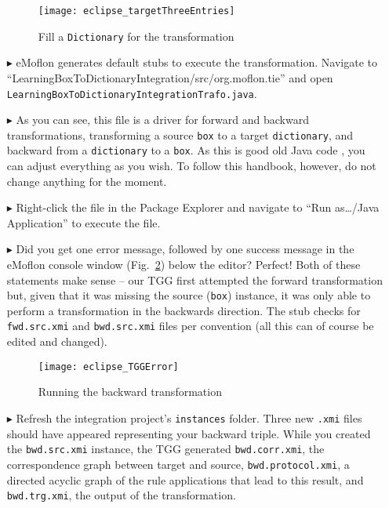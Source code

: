 \begin{itemize}
\begin{figure}[htbp]
\begin{center}
  \texttt{[image: eclipse\_targetThreeEntries]}
  \caption{Fill a \texttt{Dictionary} for the transformation}
  \label{eclipse:dictionaryxmi}
\end{center}
\end{figure}

\item[$\blacktriangleright$] eMoflon generates default stubs to execute the transformation.
Navigate to ``LearningBox\-To\-Dictionary\-In\-te\-gra\-tion\-/\-src/\-org.\-mof\-lon.\-tie'' and open \texttt{Learn\-ing\-Box\-To\-Dict\-ion\-ary\-Int\-e\-grat\-ion\-Trafo.\-java}.

\item[$\blacktriangleright$] As you can see, this file is a driver for forward and backward transformations, transforming a source \texttt{box} to a target \texttt{dictionary}, and backward from a \texttt{dictionary} to a \texttt{box}. 
As this is good old Java code , you can adjust everything as you wish.
To follow this handbook, however, do not change anything for the moment.

\item[$\blacktriangleright$] Right-click the file in the Package Explorer and navigate to ``Run as\ldots/Java Application'' to execute the file.

\item[$\blacktriangleright$] Did you get one error message, followed by one success message in the eMoflon console window (Fig.~\ref{eclipse:tggERROR}) below
the editor? Perfect! Both of these statements make sense -- our TGG first attempted the forward transformation but, given that it was missing the source
(\texttt{box}) instance, it was only able to perform a transformation in the backwards direction.
The stub checks for \texttt{fwd.src.xmi} and \texttt{bwd.src.xmi} files per convention (all this can of course be edited and changed).

\begin{figure}[htbp]
\begin{center}
  \texttt{[image: eclipse\_TGGError]}
  \caption{Running the backward transformation}
  \label{eclipse:tggERROR}
\end{center}
\end{figure}

\item[$\blacktriangleright$] Refresh the integration project's \texttt{instances} folder. 
Three new \texttt{.xmi} files should have appeared representing your backward triple. 
While you created the \texttt{bwd.src.xmi} instance, the TGG generated \texttt{bwd.corr.xmi}, the correspondence graph between target and source, \texttt{bwd.protocol.xmi}, a directed acyclic graph of the rule applications that lead to this result, and \texttt{bwd.trg.xmi}, the output of the transformation. 


\end{itemize}
